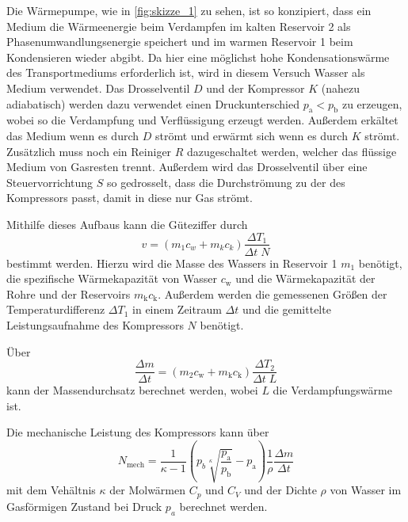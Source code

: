 Die Wärmepumpe, wie in \autoref{fig:skizze_1} zu sehen, ist so konzipiert, dass ein Medium die Wärmeenergie beim Verdampfen im kalten Reservoir 2 als Phasenumwandlungsenergie speichert und im warmen Reservoir 1 beim Kondensieren wieder abgibt.
Da hier eine möglichst hohe Kondensationswärme des Transportmediums erforderlich ist, wird in diesem Versuch Wasser als Medium verwendet.
Das Drosselventil $D$ und der Kompressor $K$ (nahezu adiabatisch) werden dazu verwendet einen Druckunterschied $p_\text{a} < p_\text{b}$ zu erzeugen, wobei so die Verdampfung und Verflüssigung erzeugt werden.
Außerdem erkältet das Medium wenn es durch $D$ strömt und erwärmt sich wenn es durch $K$ strömt.
Zusätzlich muss noch ein Reiniger $R$ dazugeschaltet werden, welcher das flüssige Medium von Gasresten trennt. 
Außerdem wird das Drosselventil über eine Steuervorrichtung $S$ so gedrosselt, dass die Durchströmung zu der des Kompressors passt, damit in diese nur Gas strömt.

Mithilfe dieses Aufbaus kann die Güteziffer durch
\begin{equation}
    v = (m_1 c_w + m_k c_k) \frac{\Delta T_1}{\Delta t \; N}
    \label{eq:gueteziffer_2}
\end{equation}
bestimmt werden. 
Hierzu wird die Masse des Wassers in Reservoir 1 $m_1$ benötigt, die spezifische Wärmekapazität von Wasser $c_\text{w}$ und die Wärmekapazität der Rohre und der Reservoirs $m_\text{k} c_\text{k}$.
Außerdem werden die gemessenen Größen der Temperaturdifferenz $\Delta T_1$ in einem Zeitraum $\Delta t$ und die gemittelte Leistungsaufnahme des Kompressors $N$ benötigt.\cite{V206}

Über
\begin{equation}
    \frac{\Delta m}{\Delta t} = (m_2 c_\text{w} + m_\text{k} c_\text{k}) \frac{\Delta T_2}{\Delta t \; L}
    \label{eq:massen}
\end{equation}
kann der Massendurchsatz berechnet werden, wobei $L$ die Verdampfungswärme ist.

Die mechanische Leistung des Kompressors kann über
\begin{equation}
    N_\text{mech} = \frac{1}{\kappa - 1} \left( p_b \sqrt[\kappa]{\frac{p_\text{a}}{p_\text{b}}} - p_\text{a} \right) \frac{1}{\rho} \frac{\Delta m}{\Delta t}
    \label{eq:arbeit}
\end{equation}
mit dem Vehältnis $\kappa$ der Molwärmen $C_p$ und $C_V$ und der Dichte $\rho$ von Wasser im Gasförmigen Zustand bei Druck $p_a$ berechnet werden.\cite{V206}